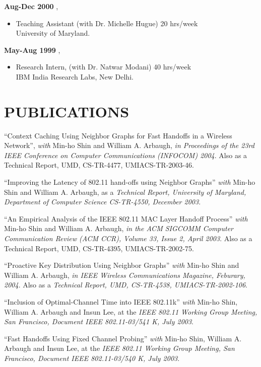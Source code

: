 \begin{resume}
 {\bf Aug-Dec 2000 },   	
    \begin{itemize}
         \item[] Teaching Assistant (with Dr. Michelle Hugue) 20 hrs/week \\
                 University of Maryland.
    \end{itemize}

 {\bf May-Aug 1999 },   	
    \begin{itemize}
         \item[] Research Intern, (with Dr. Natwar Modani) 40 hrs/week \\
                 IBM India Research Labs, New Delhi.
    \end{itemize}


\section{PUBLICATIONS}
\vspace{0.1in}

``Context Caching Using Neighbor Graphs for Fast Handoffs in a Wireless Network'', {\em with} 
Min-ho Shin and William A. Arbaugh, {\em in Proceedings of the 23rd IEEE Conference on
 Computer Communications (INFOCOM) 2004}. Also as a {Technical Report, UMD, CS-TR-4477, UMIACS-TR-2003-46}.


``Improving the Latency of 802.11 hand-offs using Neighbor Graphs'' {\em with} Min-ho Shin and William A. Arbaugh, as a
{\em Technical Report, University of Maryland, Department of Computer Science CS-TR-4550, December 2003}.


``An Empirical Analysis of the IEEE 802.11 MAC Layer Handoff Process'' {\em with}
Min-ho Shin and William A. Arbaugh, {\em in the ACM SIGCOMM Computer Communication Review (ACM CCR),
Volume 33, Issue 2, April 2003}. Also as a {Technical Report, UMD, CS-TR-4395, UMIACS-TR-2002-75}.


``Proactive Key Distribution Using Neighbor Graphs'' {\em with} Min-ho Shin and William A. Arbaugh,
{\em in IEEE Wireless Communications Magazine, Feburary, 2004}. Also as a {\em Technical Report, UMD,  CS-TR-4538, UMIACS-TR-2002-106}.


``Inclusion of Optimal-Channel Time into IEEE 802.11k'' {\em with}  Min-ho Shin, William A. Arbaugh and Insun Lee,
at the {\em IEEE 802.11 Working Group Meeting, San Francisco, Document IEEE 802.11-03/541 K, July 2003}.


``Fast Handoffs Using Fixed Channel Probing'' {\em with} Min-ho Shin, William A. Arbaugh and Insun Lee, at the 
{\em IEEE 802.11 Working Group Meeting, San Francisco, Document IEEE 802.11-03/540 K, July 2003}.



\end{resume}
